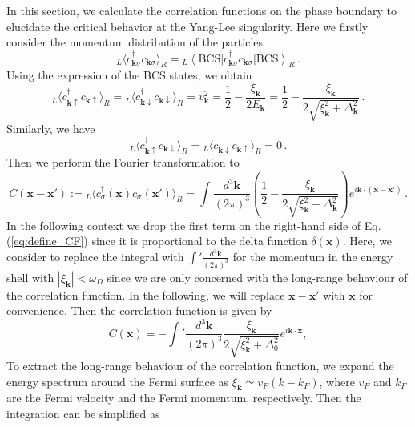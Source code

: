 \documentclass[aps,prl,twocolumn,nofootinbib,superscriptaddress,longbibliography]{revtex4-1}
\begin{document}
In this section, we calculate the correlation functions on the phase boundary to elucidate the critical behavior at the Yang-Lee singularity. Here we firstly consider the momentum distribution of the particles
\begin{equation}
  {}_L\langle c_{\bm{k} \sigma}^{\dagger} c_{\bm{k} \sigma} \rangle_R = {}_L \left\langle
  \text{BCS} \right| c_{\bm{k} \sigma}^{\dagger} c_{\bm{k} \sigma} \left| \text{BCS}\right\rangle_R \,.
\end{equation}
Using the expression of the BCS states, we obtain
\begin{equation}
  {}_L\langle c_{\bm{k} \uparrow}^{\dagger} c_{\bm{k} \uparrow} \rangle_R = {}_L\langle c_{\bm{k}\downarrow}^{\dagger} c_{\bm{k} \downarrow} \rangle_R = v_{\bm{k}}^2 = \frac{1}{2} -
  \frac{\xi_{\bm{k}}}{2 E_{\bm{k}}} = \frac{1}{2} - \frac{\xi_{\bm{k}}}{2 \sqrt{\xi_{\bm{k}}^2 +
  \Delta_{\bm{k}}^2}}\,.
\end{equation}
Similarly, we have 
\begin{equation}
  {}_L\langle c_{\bm{k} \uparrow}^{\dagger} c_{\bm{k} \downarrow} \rangle_R = {}_L\langle c_{\bm{k}\downarrow}^{\dagger} c_{\bm{k} \uparrow} \rangle_R = 0\,.
\end{equation}
Then we perform the Fourier transformation to 
\begin{equation}
  C (\bm{x}-\bm{x}') := {}_L\langle c_{\sigma}^{\dagger} (\bm{x}) c_{\sigma} (\bm{x}') \rangle_R = \int \frac{d^3 \bm{k}}{(2 \pi)^3} \left(\frac{1}{2} - \frac{\xi_{\bm{k}}}{2 \sqrt{\xi_{\bm{k}}^2 + \Delta_{\bm{k}}^2}} \right)e^{i\bm{k} \cdot (\bm{x}-\bm{x}')}\,.
\label{eq:define_CF}
\end{equation}
 In the following context we drop the first term on the right-hand side of Eq. (\ref{eq:define_CF}) since it is proportional to the delta function $\delta(\bm{x})$. Here, we consider to replace the integral with $\int ' \frac{d^3 \bm{k}}{(2 \pi)^3}$ for the momentum in the energy shell with $|\xi_{\bm{k}}|<\omega_D$ since we are only concerned with the long-range behaviour of the correlation function. 
In the following, we will replace $\bm{x}-\bm{x}'$
with $\bm{x}$ for convenience. Then the correlation
function is given by
\begin{equation}
  C (\bm{x}) = -\int ' \frac{d^3 \bm{k}}{(2 \pi)^3} \frac{\xi_{\bm{k}}}{2 \sqrt{\xi_{\bm{k}}^2
  + \Delta_0^2}} e^{i\bm{k} \cdot \bm{x}},
\end{equation}
 To extract the long-range behaviour of the correlation function, we expand the energy spectrum around the Fermi surface as $\xi_{\bm{k}} \simeq v_F (k - k_F)$, where $v_F$ and $k_F$ are the Fermi velocity and the Fermi momentum, respectively. Then the integration can be simplified as
\end{document}
